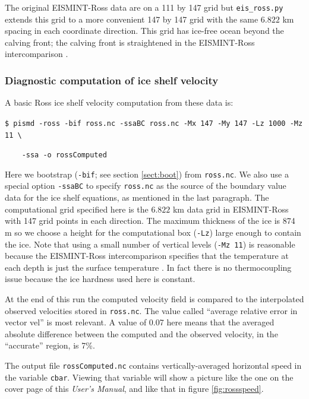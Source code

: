 \documentclass[11pt,final]{amsart}
\begin{document}
The original EISMINT-Ross data are on a 111 by 147 grid but \verb|eis_ross.py| extends this grid to a more convenient 147 by 147 grid with the same $6.822$ km spacing in each coordinate direction.  This grid has ice-free ocean beyond the calving front; the calving front is straightened in the EISMINT-Ross intercomparison \cite{MacAyealetal}.

\subsubsection*{Diagnostic computation of ice shelf velocity}  A basic Ross ice shelf velocity computation from these data is:

\verb|$ pismd -ross -bif ross.nc -ssaBC ross.nc -Mx 147 -My 147 -Lz 1000 -Mz 11 \|

\verb|    -ssa -o rossComputed|

\noindent Here we bootstrap (\verb|-bif|; see section \ref{sect:boot}) from \verb|ross.nc|.  We also use a special option \verb|-ssaBC| to specify \verb|ross.nc| as the source of the boundary value data for the ice shelf equations, as mentioned in the last paragraph.  The computational grid specified here is the $6.822$ km data grid in EISMINT-Ross with 147 grid points in each direction.  The maximum thickness of the ice is 874 m so we choose a height for the computational box (\verb|-Lz|) large enough to contain the ice.  Note that using a small number of vertical levels (\verb|-Mz 11|) is reasonable because the EISMINT-Ross intercomparison specifies that the temperature at each depth is just the surface temperature \cite{MacAyealetal}.  In fact there is no thermocoupling issue because the ice hardness used here is constant.

At the end of this run the computed velocity field is compared to the interpolated observed velocities stored in \verb|ross.nc|.  The value called ``average relative error in vector vel'' is most relevant.  A value of 0.07 here means that the averaged absolute difference between the computed and the observed velocity, in the ``accurate'' region, is 7\%.

The output file \verb|rossComputed.nc| contains vertically-averaged horizontal speed in the variable \verb|cbar|.  Viewing that variable will show a picture like the one on the cover page of this \emph{User's Manual}, and like that in figure \ref{fig:rossspeed}.
\end{document}
